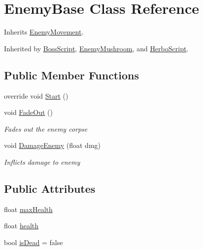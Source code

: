 \hypertarget{class_enemy_base}{}\section{Enemy\+Base Class Reference}
\label{class_enemy_base}


Inherits \hyperlink{class_enemy_movement}{Enemy\+Movement}.



Inherited by \hyperlink{class_boss_script}{Boss\+Script}, \hyperlink{class_enemy_mushroom}{Enemy\+Mushroom}, and \hyperlink{class_herbo_script}{Herbo\+Script}.

\subsection*{Public Member Functions}
\begin{DoxyCompactItemize}
\item 
override void \hyperlink{class_enemy_base_a885f490a36e40840c886f9298ed3f2b7}{Start} ()
\item 
void \hyperlink{class_enemy_base_a169427b3ce3e885adbb114dc37b327ed}{Fade\+Out} ()
\begin{DoxyCompactList}\small\item\em Fades out the enemy corpse \end{DoxyCompactList}\item 
void \hyperlink{class_enemy_base_a8225b5636fa25a9ca02c09c26075b0d1}{Damage\+Enemy} (float dmg)
\begin{DoxyCompactList}\small\item\em Inflicts damage to enemy \end{DoxyCompactList}\end{DoxyCompactItemize}
\subsection*{Public Attributes}
\begin{DoxyCompactItemize}
\item 
float \hyperlink{class_enemy_base_a3c546ced55e1151b9fff4fbb231829fc}{max\+Health}
\item 
float \hyperlink{class_enemy_base_ab374b875d914f66d7b6c57ee1952baea}{health}
\item 
bool \hyperlink{class_enemy_base_ab4565b2e106ecb78b0c67b328af09b7d}{is\+Dead} = false
\end{DoxyCompactItemize}
